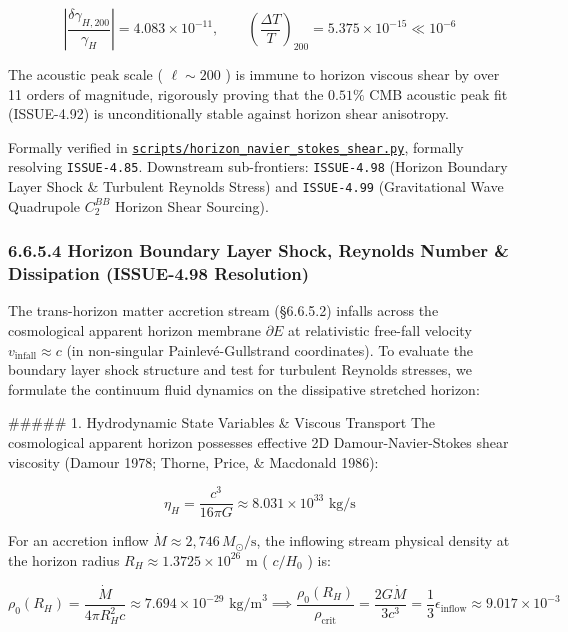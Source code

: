 \documentclass[11pt,a4paper]{article}
\theoremstyle{definition}
\theoremstyle{remark}
\begin{document}
\begin{equation}
\left| \frac{\delta\gamma_{H, 200}}{\gamma_H} \right| = 4.083 \times 10^{-11}, \qquad \left( \frac{\Delta T}{T} \right)_{200} = 5.375 \times 10^{-15} \ll 10^{-6}
\end{equation}


The acoustic peak scale ( $\ell \sim 200$ ) is immune to horizon viscous shear by over 11 orders of magnitude, rigorously proving that the $0.51\%$ CMB acoustic peak fit (ISSUE-4.92) is unconditionally stable against horizon shear anisotropy.

Formally verified in \href{../../scripts/horizon_navier_stokes_shear.py}{\texttt{scripts/horizon_navier_stokes_shear.py}}, formally resolving \texttt{ISSUE-4.85}. Downstream sub-frontiers: \texttt{ISSUE-4.98} (Horizon Boundary Layer Shock \& Turbulent Reynolds Stress) and \texttt{ISSUE-4.99} (Gravitational Wave Quadrupole $C_2^{BB}$ Horizon Shear Sourcing).

\subsubsection{6.6.5.4 Horizon Boundary Layer Shock, Reynolds Number \& Dissipation (ISSUE-4.98 Resolution)}

The trans-horizon matter accretion stream (\S 6.6.5.2) infalls across the cosmological apparent horizon membrane $\partial E$ at relativistic free-fall velocity $v_{\text{infall}} \approx c$ (in non-singular Painlevé-Gullstrand coordinates). To evaluate the boundary layer shock structure and test for turbulent Reynolds stresses, we formulate the continuum fluid dynamics on the dissipative stretched horizon:

\#\#\#\#\# 1. Hydrodynamic State Variables \& Viscous Transport
The cosmological apparent horizon possesses effective 2D Damour-Navier-Stokes shear viscosity (Damour 1978; Thorne, Price, \& Macdonald 1986):


\begin{equation}
\eta_H = \frac{c^3}{16\pi G} \approx 8.031 \times 10^{33}\text{ kg/s}
\end{equation}


For an accretion inflow $\dot{M} \approx 2{,}746\,M_\odot/\text{s}$, the inflowing stream physical density at the horizon radius $R_H \approx 1.3725 \times 10^{26}\text{ m}$ ( $c/H_0$ ) is:


\begin{equation}
\rho_0(R_H) = \frac{\dot{M}}{4\pi R_H^2 c} \approx 7.694 \times 10^{-29}\text{ kg/m}^3 \implies \frac{\rho_0(R_H)}{\rho_{\text{crit}}} = \frac{2 G \dot{M}}{3 c^3} = \frac{1}{3}\epsilon_{\text{inflow}} \approx 9.017 \times 10^{-3}
\end{equation}
\end{document}
